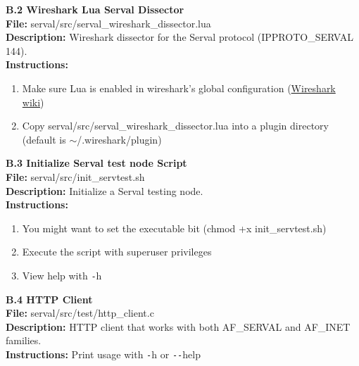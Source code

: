 \newpage
{}
{}
\label{sec:wirlua}
{\huge \bf \noindent B.2 Wireshark Lua Serval Dissector}\\[0.5cm]
\textbf{File:} serval/src/serval\_wireshark\_dissector.lua\\
\textbf{Description:} Wireshark dissector for the Serval protocol (IPPROTO\_SERVAL 144).\\
\textbf{Instructions: }
\begin{enumerate} \itemsep1pt \parskip0pt 
	\item Make sure Lua is enabled in wireshark's global configuration (\href{http://wiki.wireshark.org/Lua}{Wireshark wiki})
	\item Copy serval/src/serval\_wireshark\_dissector.lua into a plugin directory (default is $\sim$/.wireshark/plugin)\\[0.5cm]
\end{enumerate}


\newpage
{}
{}
{\huge \bf \noindent B.3 Initialize Serval test node Script}\\[0.5cm]
\textbf{File:} serval/src/init\_servtest.sh\\
\textbf{Description:} Initialize a Serval testing node.\\
\textbf{Instructions: }
\begin{enumerate} \itemsep1pt \parskip0pt 
	\item You might want to set the executable bit (chmod +x init\_servtest.sh)
	\item Execute the script with superuser privileges
	\item View help with \texttt{-}h\\[0.5cm]
\end{enumerate}


\newpage
{}
{}
{\huge \bf \noindent B.4 HTTP Client}\\[0.5cm]
\textbf{File:} serval/src/test/http\_client.c\\
\textbf{Description:} HTTP client that works with both AF\_SERVAL and AF\_INET families.\\
\textbf{Instructions: } Print usage with \texttt{-}h or \texttt{{-}{-}}help\\[0.5cm]


